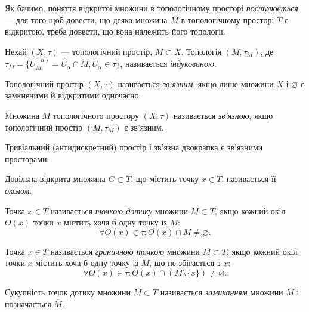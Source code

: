 \documentclass[a4paper, 12pt]{article}
\renewcommand{\emptyset}{\varnothing}
\begin{document}
Як бачимо, поняття відкритої множини в топологічному
просторі \textit{постулюється} --- для того щоб довести, що деяка
множина $M$ в топологічному просторі $T$ є відкритою, треба
довести, що вона належить його топології.

\begin{definition}
	Нехай $(X, \tau)$ --- топологічний простір, $M \subset X$.
	Топологія $(M, \tau_M)$, де $\tau_M = \{ U_M^{(\alpha)} = U_\alpha \cap M, U_\alpha \in \tau\}$,
	називається \textit{індукованою.} 
\end{definition}

\begin{definition}
	Топологічний простір $(X, \tau)$ називається
	\textit{зв'язним}, якщо лише множини $X$ і $\emptyset$ є замкненими й
	відкритими одночасно.
\end{definition}

\begin{definition}
	Mножина $M$ топологічного простору $(X, \tau)$
	називається \textit{зв'язною}, якщо топологічний простір $(M, \tau_M)$
	є зв'язним.
\end{definition}

\begin{example}
	Тривіальний (антидискретний) простір і
	зв'язна двокрапка є зв'яз\-ни\-ми просторами.
\end{example}

\begin{definition}
	Довільна відкрита множина $G \subset T$, що
	містить точку $x \in T$, називається її \textit{околом}.
\end{definition}

\begin{definition}
	Точка $x \in T$ називається \textit{точкою дотику}
	множини $M \subset T$, якщо кожний окіл $O(x)$ точки $x$ містить
	хоча б одну точку із $M$: \[\forall O(x) \in \tau: O(x) \cap M \ne \emptyset.\]
\end{definition}

\begin{definition}
	Точка $x \in T$ називається \textit{граничною точкою}
	множини $M \subset T$, якщо кожний окіл точки $x$ містить хоча
	б одну точку із $M$, що не збігається з $x$: \[\forall O(x) \in \tau: O(x) \cap (M \setminus \{x\}) \ne \emptyset.\]
\end{definition}

\begin{definition}
	Сукупність точок дотику множини $M \subset T$
	називається \textit{замиканням} множини $M$ і позначається $\overline{M}$.
\end{definition}
\end{document}
